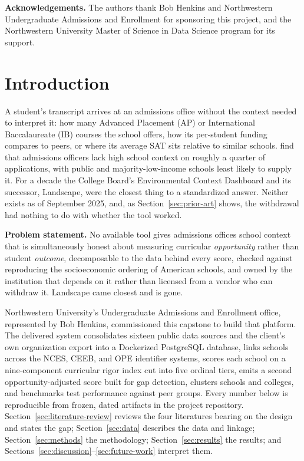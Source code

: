 \documentclass[12pt]{article}
\begin{document}
\medskip
\noindent\textbf{Acknowledgements.} The authors thank Bob Henkins and Northwestern Undergraduate Admissions and Enrollment for sponsoring this project, and the Northwestern University Master of Science in Data Science program for its support.

\newpage
\tableofcontents
\newpage

\setcounter{page}{1}
\doublespacing

\section{Introduction}
\label{sec:introduction}

A student's transcript arrives at an admissions office without the context needed to interpret it: how many Advanced Placement (AP) or International Baccalaureate (IB) courses the school offers, how its per-student funding compares to peers, or where its average SAT sits relative to similar schools. \citet{bastedo2023} find that admissions officers lack high school context on roughly a quarter of applications, with public and majority-low-income schools least likely to supply it. For a decade the College Board's Environmental Context Dashboard and its successor, Landscape, were the closest thing to a standardized answer. Neither exists as of September 2025, and, as Section~\ref{sec:prior-art} shows, the withdrawal had nothing to do with whether the tool worked.

\textbf{Problem statement.} No available tool gives admissions offices school context that is simultaneously honest about measuring curricular \emph{opportunity} rather than student \emph{outcome}, decomposable to the data behind every score, checked against reproducing the socioeconomic ordering of American schools, and owned by the institution that depends on it rather than licensed from a vendor who can withdraw it. Landscape came closest and is gone.

Northwestern University's Undergraduate Admissions and Enrollment office, represented by Bob Henkins, commissioned this capstone to build that platform. The delivered system consolidates sixteen public data sources and the client's own organization export into a Dockerized PostgreSQL database, links schools across the NCES, CEEB, and OPE identifier systems, scores each school on a nine-component curricular rigor index cut into five ordinal tiers, emits a second opportunity-adjusted score built for gap detection, clusters schools and colleges, and benchmarks test performance against peer groups. Every number below is reproducible from frozen, dated artifacts in the project repository. Section~\ref{sec:literature-review} reviews the four literatures bearing on the design and states the gap; Section~\ref{sec:data} describes the data and linkage; Section~\ref{sec:methods} the methodology; Section~\ref{sec:results} the results; and Sections~\ref{sec:discussion}--\ref{sec:future-work} interpret them.
\end{document}
